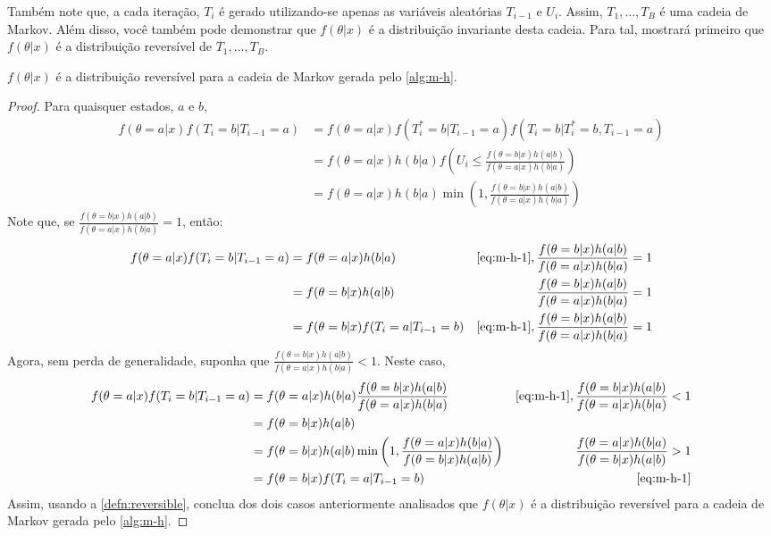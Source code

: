 Também note que, a cada iteração, $T_i$ é gerado
utilizando-se apenas as variáveis aleatórias
$T_{i-1}$ e $U_{i}$. Assim,
$T_{1},\ldots,T_{B}$ é uma cadeia de Markov.
Além disso, você também pode demonstrar que
$f(\theta|x)$ é a distribuição invariante 
desta cadeia.
Para tal, mostrará primeiro que 
$f(\theta|x)$ é a distribuição reversível de
$T_{1},\ldots,T_{B}$.

\begin{lemma}
 \label{lemma:mh-reversible}
 $f(\theta|x)$ é a distribuição reversível para
 a cadeia de Markov gerada pelo \cref{alg:m-h}.
\end{lemma}

\begin{proof}
 Para quaisquer estados, $a$ e $b$,
 \begin{align}
  \label{eq:m-h-1}
  f(\theta=a|x)f(T_{i}=b|T_{i-1}=a)
  &= f(\theta=a|x)f(T^{*}_i=b|T_{i-1}=a)
  f(T_{i}=b|T^{*}_{i}=b,T_{i-1}=a) \nonumber \\
  &= f(\theta=a|x)h(b|a)
  f\left(U_i \leq \frac{f(\theta=b|x)h(a|b)}
  {f(\theta=a|x)h(b|a)}\right) \nonumber \\
  &= f(\theta=a|x)h(b|a)
  \min\left(1,\frac{f(\theta=b|x)h(a|b)}
  {f(\theta=a|x)h(b|a)}\right)
 \end{align}
 Note que, se $\frac{f(\theta=b|x)h(a|b)}{f(\theta=a|x)h(b|a)}=1$, então:
 \begin{align*}
  f(\theta=a|x)f(T_{i}=b|T_{i-1}=a) &=
  f(\theta=a|x)h(b|a)
  & \text{\cref{eq:m-h-1}},
  \frac{f(\theta=b|x)h(a|b)}{f(\theta=a|x)h(b|a)}=1\\
  &= f(\theta=b|x)h(a|b)
  &\frac{f(\theta=b|x)h(a|b)}{f(\theta=a|x)h(b|a)}=1\\
  &= f(\theta=b|x)f(T_{i}=a|T_{i-1}=b)
  & \text{\cref{eq:m-h-1}},
  \frac{f(\theta=b|x)h(a|b)}{f(\theta=a|x)h(b|a)}=1
 \end{align*}
 Agora, sem perda de generalidade, suponha que
 $\frac{f(\theta=b|x)h(a|b)}{f(\theta=a|x)h(b|a)}<1$.
 Neste caso,
 \begin{align*}
  f(\theta=a|x)f(T_{i}=b|T_{i-1}=a) &=
  f(\theta=a|x)h(b|a)
  \frac{f(\theta=b|x)h(a|b)}
  {f(\theta=a|x)h(b|a)}
  & \text{\cref{eq:m-h-1}},
  \frac{f(\theta=b|x)h(a|b)}{f(\theta=a|x)h(b|a)}<1\\
  &= f(\theta=b|x)h(a|b) \\
  &= f(\theta=b|x)h(a|b)
  \min\left(1,\frac{f(\theta=a|x)h(b|a)}
  {f(\theta=b|x)h(a|b)}\right)
  &\frac{f(\theta=a|x)h(b|a)}{f(\theta=b|x)h(a|b)}>1\\
  &=f(\theta=b|x)f(T_i=a|T_{i-1}=b)
  & \text{\cref{eq:m-h-1}}
 \end{align*}
 Assim, usando a \cref{defn:reversible},
 conclua dos dois casos anteriormente
 analisados que $f(\theta|x)$ é a 
 distribuição reversível para a cadeia de Markov
 gerada pelo \cref{alg:m-h}.
\end{proof}

